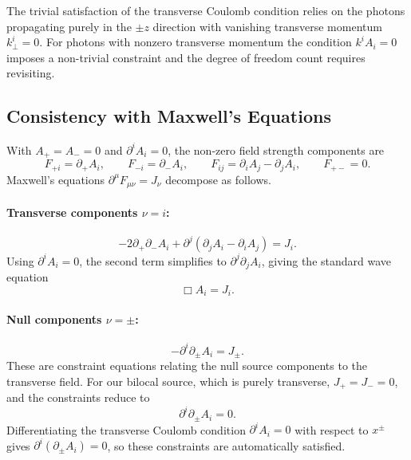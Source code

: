 \documentclass[12pt,a4paper]{article}
\begin{document}
The trivial satisfaction of the transverse Coulomb condition 
relies on the photons propagating purely in the $\pm z$ direction 
with vanishing transverse momentum $k^i_\perp = 0$. For photons 
with nonzero transverse momentum the condition $k^i A_i = 0$ 
imposes a non-trivial constraint and the degree of freedom count 
requires revisiting.

\subsection{Consistency with Maxwell's Equations}

With $A_+ = A_- = 0$ and $\partial^i A_i = 0$, the non-zero field strength 
components are
\begin{equation}
    F_{+i} = \partial_+ A_i, \qquad F_{-i} = \partial_- A_i, \qquad 
    F_{ij} = \partial_i A_j - \partial_j A_i, \qquad F_{+-} = 0.
\end{equation}
Maxwell's equations $\partial^\mu F_{\mu\nu} = J_\nu$ decompose as follows.

\paragraph{Transverse components $\nu = i$:}
\begin{equation}
    -2\partial_+\partial_- A_i + \partial^j(\partial_j A_i - \partial_i A_j) = J_i.
\end{equation}
Using $\partial^i A_i = 0$, the second term simplifies to $\partial^j\partial_j A_i$, 
giving the standard wave equation
\begin{equation}
    \boxed{\Box A_i = J_i.}
    \label{eq:wave}
\end{equation}

\paragraph{Null components $\nu = \pm$:}
\begin{equation}
    -\partial^i\partial_\pm A_i = J_\pm.
\end{equation}
These are constraint equations relating the null source components to the transverse 
field. For our bilocal source, which is purely transverse, $J_+ = J_- = 0$, and the 
constraints reduce to
\begin{equation}
    \partial^i\partial_\pm A_i = 0.
\end{equation}
Differentiating the transverse Coulomb condition $\partial^i A_i = 0$ with respect 
to $x^\pm$ gives $\partial^i(\partial_\pm A_i) = 0$, so these constraints are 
automatically satisfied. \checkmark
\end{document}
